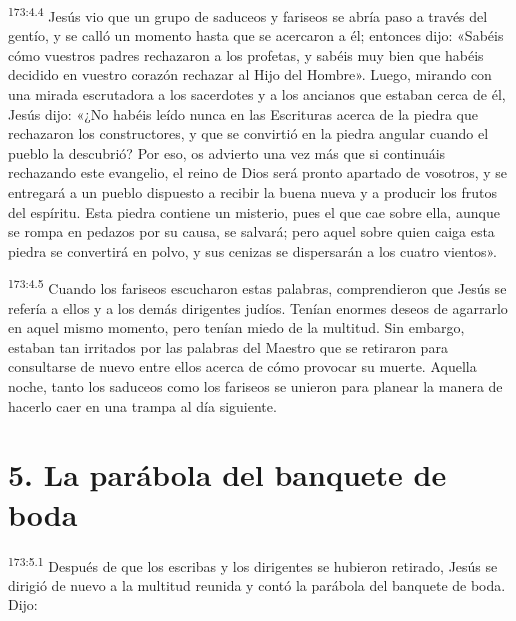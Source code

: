 \par 
\textsuperscript{173:4.4} Jesús vio que un grupo de saduceos y fariseos se abría paso a través del gentío, y se calló un momento hasta que se acercaron a él; entonces dijo: «Sabéis cómo vuestros padres rechazaron a los profetas, y sabéis muy bien que habéis decidido en vuestro corazón rechazar al Hijo del Hombre». Luego, mirando con una mirada escrutadora a los sacerdotes y a los ancianos que estaban cerca de él, Jesús dijo: «¿No habéis leído nunca en las Escrituras acerca de la piedra que rechazaron los constructores, y que se convirtió en la piedra angular cuando el pueblo la descubrió? Por eso, os advierto una vez más que si continuáis rechazando este evangelio, el reino de Dios será pronto apartado de vosotros, y se entregará a un pueblo dispuesto a recibir la buena nueva y a producir los frutos del espíritu. Esta piedra contiene un misterio, pues el que cae sobre ella, aunque se rompa en pedazos por su causa, se salvará; pero aquel sobre quien caiga esta piedra se convertirá en polvo, y sus cenizas se dispersarán a los cuatro vientos».

\par 
\textsuperscript{173:4.5} Cuando los fariseos escucharon estas palabras, comprendieron que Jesús se refería a ellos y a los demás dirigentes judíos. Tenían enormes deseos de agarrarlo en aquel mismo momento, pero tenían miedo de la multitud. Sin embargo, estaban tan irritados por las palabras del Maestro que se retiraron para consultarse de nuevo entre ellos acerca de cómo provocar su muerte. Aquella noche, tanto los saduceos como los fariseos se unieron para planear la manera de hacerlo caer en una trampa al día siguiente.

\section*{5. La parábola del banquete de boda}
\par 
\textsuperscript{173:5.1} Después de que los escribas y los dirigentes se hubieron retirado, Jesús se dirigió de nuevo a la multitud reunida y contó la parábola del banquete de boda. Dijo:

